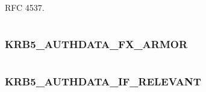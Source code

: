 \documentclass[letterpaper,10pt,english]{sphinxmanual}
\begin{document}
\begin{fulllineitems}
\label{appdev/refs/macros/KRB5_AUTHDATA_ETYPE_NEGOTIATION:KRB5_AUTHDATA_ETYPE_NEGOTIATION}
\end{fulllineitems}


RFC 4537.

\begin{tabulary}{\linewidth}{|L|L|}
\hline

 & 
\\
\hline\end{tabulary}



\subsubsection{KRB5\_AUTHDATA\_FX\_ARMOR}
\label{appdev/refs/macros/KRB5_AUTHDATA_FX_ARMOR::doc}\label{appdev/refs/macros/KRB5_AUTHDATA_FX_ARMOR:krb5-authdata-fx-armor}\label{appdev/refs/macros/KRB5_AUTHDATA_FX_ARMOR:krb5-authdata-fx-armor-data}

\begin{fulllineitems}
\label{appdev/refs/macros/KRB5_AUTHDATA_FX_ARMOR:KRB5_AUTHDATA_FX_ARMOR}
\end{fulllineitems}


\begin{tabulary}{\linewidth}{|L|L|}
\hline

 & 
\\
\hline\end{tabulary}



\subsubsection{KRB5\_AUTHDATA\_IF\_RELEVANT}
\label{appdev/refs/macros/KRB5_AUTHDATA_IF_RELEVANT:krb5-authdata-if-relevant-data}\label{appdev/refs/macros/KRB5_AUTHDATA_IF_RELEVANT:krb5-authdata-if-relevant}\label{appdev/refs/macros/KRB5_AUTHDATA_IF_RELEVANT::doc}

\begin{fulllineitems}
\label{appdev/refs/macros/KRB5_AUTHDATA_IF_RELEVANT:KRB5_AUTHDATA_IF_RELEVANT}
\end{fulllineitems}
\end{document}
